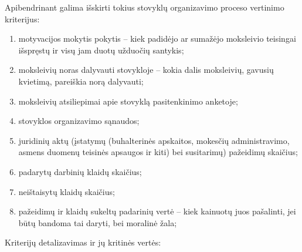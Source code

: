 Apibendrinant galima išskirti tokius stovyklų organizavimo proceso 
vertinimo kriterijus:
\begin{enumerate}%
  \item motyvacijos mokytis pokytis – kiek padidėjo
    ar sumažėjo moksleivio teisingai išspręstų ir visų jam duotų užduočių
    santykis; 
  \item moksleivių noras dalyvauti stovykloje – kokia 
    dalis moksleivių, gavusių kvietimą, pareiškia norą dalyvauti;
  \item moksleivių atsiliepimai apie stovyklą pasitenkinimo anketoje;
  \item stovyklos organizavimo sąnaudos;
  \item juridinių aktų (įstatymų (buhalterinės apskaitos,
    mokesčių administravimo, asmens duomenų teisinės apsaugos
    ir kiti) bei susitarimų) pažeidimų skaičius;
  \item padarytų darbinių klaidų skaičius; %
  \item neištaisytų klaidų skaičius;
  \item pažeidimų  ir klaidų sukeltų padarinių vertė – kiek kainuotų juos 
    pašalinti, jei būtų bandoma tai daryti, bei moralinė žala;

\end{enumerate}

Kriterijų detalizavimas ir jų kritinės vertės:



